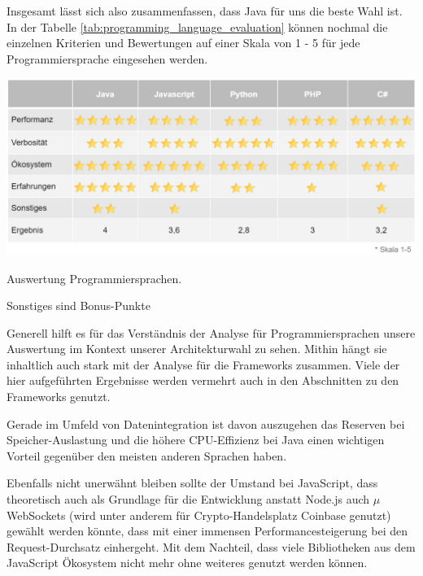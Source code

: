 Insgesamt lässt sich also zusammenfassen, dass Java für uns die beste Wahl ist. In der Tabelle \ref{tab:programming_language_evaluation} können nochmal die einzelnen Kriterien und Bewertungen auf einer Skala von 1 - 5 für jede Programmiersprache eingesehen werden.
\begin{table}[!h]
\centering
\includegraphics[width=14cm]{images/0x_technology_stack/programming_language_comparison_table.png}
\caption{Auswertung Programmiersprachen.}
\label{tab:programming_language_evaluation}
\small{Sonstiges sind Bonus-Punkte}
\end{table}

Generell hilft es für das Verständnis der Analyse für Programmiersprachen unsere Auswertung im Kontext unserer Architekturwahl zu sehen. Mithin hängt sie inhaltlich auch stark mit der Analyse für die Frameworks zusammen. Viele der hier aufgeführten Ergebnisse werden vermehrt auch in den Abschnitten zu den Frameworks genutzt.

Gerade im Umfeld von Datenintegration ist davon auszugehen das Reserven bei Speicher-Auslastung und die höhere CPU-Effizienz bei Java einen wichtigen Vorteil gegenüber den meisten anderen Sprachen haben.

Ebenfalls nicht unerwähnt bleiben sollte der Umstand bei JavaScript, dass theoretisch auch als Grundlage für die Entwicklung anstatt Node.js auch $\mu$WebSockets (wird unter anderem für Crypto-Handelsplatz Coinbase genutzt) gewählt werden könnte, dass mit einer immensen Performancesteigerung bei den Request-Durchsatz einhergeht. Mit dem Nachteil, dass viele Bibliotheken aus dem JavaScript Ökosystem nicht mehr ohne weiteres genutzt werden können.
